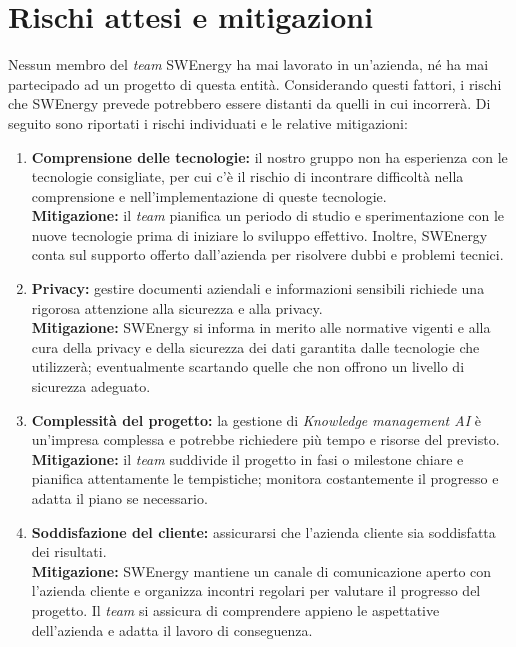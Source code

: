 \section{Rischi attesi e mitigazioni}

Nessun membro del \textit{team} SWEnergy ha mai lavorato in un'azienda, né ha
mai partecipado ad un progetto di questa entità. Considerando questi fattori, i
rischi che SWEnergy prevede potrebbero essere distanti da quelli in cui
incorrerà. 
Di seguito sono riportati i rischi individuati e le relative mitigazioni:
\begin{enumerate}

\item \textbf{Comprensione delle tecnologie:} il nostro gruppo non ha esperienza 
con le tecnologie consigliate, per cui c'è il rischio di incontrare 
difficoltà nella comprensione e nell'implementazione di queste tecnologie. \\
\textbf{Mitigazione:} il \textit{team} pianifica un periodo di studio e 
sperimentazione con 
le nuove tecnologie prima di iniziare lo sviluppo effettivo. Inoltre, SWEnergy
conta sul supporto offerto dall'azienda per risolvere dubbi e problemi tecnici.

\item \textbf{Privacy:} gestire documenti aziendali e 
informazioni sensibili richiede una rigorosa attenzione alla sicurezza e alla 
privacy. \\
\textbf{Mitigazione:} SWEnergy si informa in merito alle normative vigenti
e alla
cura della privacy e della sicurezza dei dati garantita dalle tecnologie che
utilizzerà; eventualmente scartando quelle che non offrono un livello di
sicurezza adeguato.

\item \textbf{Complessità del progetto:} la gestione di \textit{Knowledge 
management AI} è
un'impresa complessa e potrebbe richiedere più tempo e risorse del previsto. \\
\textbf{Mitigazione:} il \textit{team} suddivide il progetto in fasi o 
milestone chiare e 
pianifica attentamente le tempistiche; monitora costantemente il progresso e
adatta il piano se necessario. 

\item \textbf{Soddisfazione del cliente:} assicurarsi che l'azienda cliente sia 
soddisfatta dei risultati. \\
\textbf{Mitigazione:} SWEnergy mantiene un canale di comunicazione aperto con 
l'azienda 
cliente e organizza incontri regolari per valutare il progresso del progetto. 
Il \textit{team} si assicura di comprendere appieno le aspettative dell'azienda 
e adatta il lavoro di conseguenza.
\end{enumerate}
